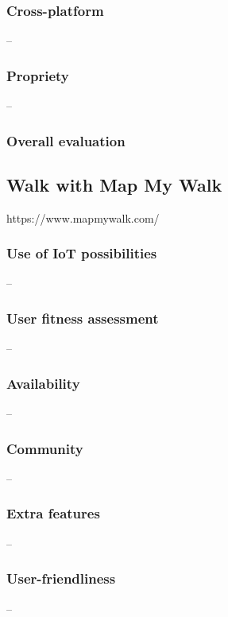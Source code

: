 \subsubsection*{Cross-platform} -- 
\subsubsection*{Propriety} -- 
\subsubsection*{Overall evaluation}

\subsection{Walk with Map My Walk}
https://www.mapmywalk.com/
\subsubsection*{Use of IoT possibilities} --
\subsubsection*{User fitness assessment} --
\subsubsection*{Availability} --
\subsubsection*{Community} -- 
\subsubsection*{Extra features} -- 
\subsubsection*{User-friendliness} -- 

